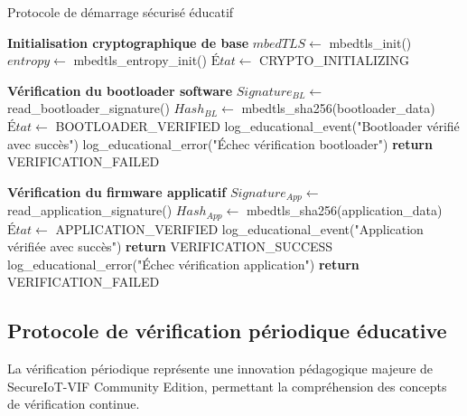 \begin{algorithm}
\caption{Protocole de démarrage sécurisé éducatif}
\label{alg:secure-boot-educational}
\begin{algorithmic}[1]
\State \textbf{Initialisation cryptographique de base}
\State $mbedTLS \leftarrow$ mbedtls\_init()
\State $entropy \leftarrow$ mbedtls\_entropy\_init()
\State $État \leftarrow$ CRYPTO\_INITIALIZING

\State \textbf{Vérification du bootloader software}
\State $Signature_{BL} \leftarrow$ read\_bootloader\_signature()
\State $Hash_{BL} \leftarrow$ mbedtls\_sha256(bootloader\_data)
    \State $État \leftarrow$ BOOTLOADER\_VERIFIED
    \State log\_educational\_event("Bootloader vérifié avec succès")
\Else
    \State log\_educational\_error("Échec vérification bootloader")
    \State \textbf{return} VERIFICATION\_FAILED
\EndIf

\State \textbf{Vérification du firmware applicatif}
\State $Signature_{App} \leftarrow$ read\_application\_signature()
\State $Hash_{App} \leftarrow$ mbedtls\_sha256(application\_data)
    \State $État \leftarrow$ APPLICATION\_VERIFIED
    \State log\_educational\_event("Application vérifiée avec succès")
    \State \textbf{return} VERIFICATION\_SUCCESS
\Else
    \State log\_educational\_error("Échec vérification application")
    \State \textbf{return} VERIFICATION\_FAILED
\EndIf
\end{algorithmic}
\end{algorithm}

\subsection{Protocole de vérification périodique éducative}

La vérification périodique représente une innovation pédagogique majeure de SecureIoT-VIF Community Edition, permettant la compréhension des concepts de vérification continue.

